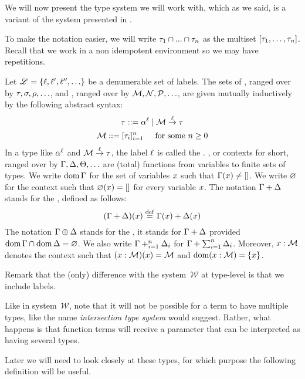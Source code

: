 We will now present the type system we will work with, which as we said, is a variant of the system presented
in \cite{bucciarelli2017non}.

To make the notation easier, we will write $\tau_1 \cap ... \cap \tau_n$ as the
multiset $[\tau_1, \hdots, \tau_n]$.
Recall that we work in a non idempotent environment so we may have repetitions.

\begin{definition}
Let $\mathscr{L} = \{\ell,\ell',\ell'',\hdots\}$ be a denumerable set of labels.
The sets of , ranged over by $\tau,\sigma,\rho,\hdots$,
and , ranged over by $\mathcal{M},\mathcal{N},\mathcal{P},\hdots$,
are given mutually inductively by the following abstract syntax:
\[
  \tau ::= \alpha^{\ell} \mid \mathcal{M} \overset{\ell}{\to} \tau
\]
\[
  \mathcal{M} ::= [\tau_i]_{i=1}^{n} \hspace{.5cm} \text{for some $n \geq 0$}
\]
In a type like $\alpha^{\ell}$ and $\mathcal{M} \overset{\ell}{\to} \tau$,
the label $\ell$ is called the .
, or contexts for short,
ranged over by $\Gamma,\Delta,\Theta,\hdots$ are (total) functions from variables to finite sets of types.
We write $\operatorname{dom}\Gamma$ for the set of variables $x$ such that $\Gamma(x) \neq []$.
We write $\varnothing$ for the context such that $\varnothing(x) = []$ for every variable $x$.
The notation $\Gamma + \Delta$ stands for the , defined as follows:
\[
    (\Gamma + \Delta)(x) \overset{\mathrm{def}}{=} \Gamma(x) + \Delta(x)
\]
The notation $\Gamma \oplus \Delta$ stands for the ,
\ie it stands for $\Gamma + \Delta$ provided $\operatorname{dom}\Gamma \cap \operatorname{dom}\Delta = \varnothing$.
We also write $\Gamma +_{i=1}^{n} \Delta_i$ for $\Gamma + \sum_{i=1}^{n} \Delta_i$.
Moreover, $x : \mathcal{M}$ denotes the context such that $(x : \mathcal{M})(x) = \mathcal{M}$
and $\operatorname{dom}(x : \mathcal{M}) = \{x\}$.
\end{definition}

Remark that the (only) difference with the system~$\mathcal{W}$
at type-level is that we include labels.

Like in system~$\mathcal{W}$, note that it will not be possible for a term to have multiple types,
like the name \textit{intersection type system} would suggest.
Rather, what happens is that function terms will receive a parameter that can be interpreted
as having several types.

Later we will need to look closely at these types,
for which purpose the following definition will be useful.

